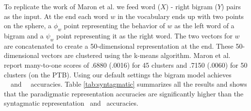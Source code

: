 To replicate the work of Maron et al.  we
feed word ($X$) - right bigram ($Y$) pairs as the input.  At the end
each word $w$ in the vocabulary ends up with two points on the sphere,
a $\phi_w$ point representing the behavior of $w$ as the left word of
a bigram and a $\psi_w$ point representing it as the right word.  The
two vectors for $w$ are concatenated to create a 50-dimensional
representation at the end.  These 50-dimensional vectors are clustered
using the k-means algorithm.  Maron et al. 
report many-to-one scores of .6880 (.0016) for 45 clusters and .7150
(.0060) for 50 clusters (on the PTB).  Using our default settings the
bigram model achieves \bgmto\ \mto\ and \bgvm\ \vm\ accuracies.  Table
\ref{tab:syntagmatic} summarizes all the results and shows that the
paradigmatic representation accuracies are significantly higher than
the syntagmatic representation \mto\ and \vm\ accuracies.
